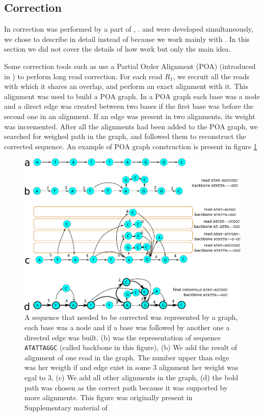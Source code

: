 \documentclass[main]{subfiles}
\begin{document}
\subsection{Correction}

In \canu correction was performed by a part of  \cite{falcon}, .  and \canu were developed simultaneously, we chose to describe \canu in detail instead of  because we work mainly with \canu. In this section we did not cover the details of how  work but only the main idea.

Some correction tools such as  use a Partial Order Alignment (POA) (introduced in \cite{poa}) to perform long read correction. For each read \texttt{$R_1$}, we recruit all the reads with which it shares an overlap, and perform an exact alignment with it. This alignment was used to build a POA graph. In a POA graph each base was a node and a direct edge was created between two bases if the first base was before the second one in an alignment. If an edge was present in two alignments, its weight was incremented. After all the alignments had been added to the POA graph, we searched for weighed path in the graph, and followed them to reconstruct the corrected sequence. An example of POA graph construction is present in figure \ref{sota:fig:canu:correction}

\begin{figure}[ht]
    \centering
    \includegraphics[width=\textwidth]{state_of_the_art/images/POA_explain.pdf}
    \caption{A sequence that needed to be corrected was represented by a graph, each base was a node and if a base was followed by another one a directed edge was built. (b) was the representation of sequence \texttt{ATATTAGGC} (called backbone in this figure), (b) We add the result of alignment of one read in the graph. The number upper than edge was her weigth if and edge exist in some 3 alignment her weight was egal to 3, (c) We add all other alignments in the graph, (d) the bold path was chosen as the correct path because it was supported by more alignments. This figure was originally present in Supplementary material of \hgap \cite{hgap}}
    \label{sota:fig:canu:correction}
\end{figure}
\end{document}
